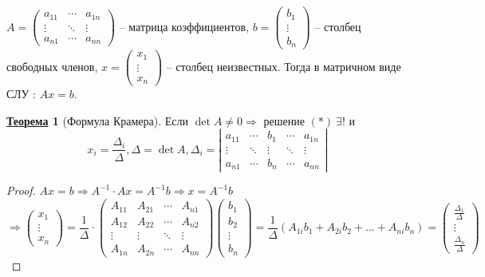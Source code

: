 \documentclass[12pt]{article}
\def\SO{\Rightarrow}     %
\theoremstyle{definition} %
\newtheorem{Thm}{\underline{Теорема}}[subsection] %
\theoremstyle{plain} %
\theoremstyle{remark} %
\begin{document}
{$A = \left(\begin{array}{ccc}
a_{11} & \cdots & a_{1n} \\ 
\vdots & \ddots & \vdots \\ 
a_{n1} & \cdots & a_{nn}
\end{array}\right)$ -- матрица коэффициентов, $b = \begin{pmatrix}
b_1 \\ 
\vdots \\ 
b_n
\end{pmatrix}$ -- столбец свободных членов, $x = \begin{pmatrix}
x_1 \\ 
\vdots \\ 
x_n
\end{pmatrix}$ -- столбец неизвестных.
Тогда в матричном виде СЛУ : $A x = b$.

\begin{Thm}[Формула Крамера]
    Если $\det A \neq 0 \SO$ решение $(*) \ \exists ! $ и
    \[x_i = \frac{\Delta_i}{\Delta}, \Delta = \det A, \Delta_i = \left|\begin{array}{ccccc}
    a_{11} & \cdots & b_1 & \cdots & a_{1n} \\ 
    \vdots & \ddots & \vdots & \ddots & \vdots \\ 
    a_{n1} & \cdots & b_n & \cdots & a_{nn}
    \end{array}\right|\] 
\end{Thm}

\begin{proof}
    $Ax = b \SO A^{-1} \cdot Ax = A^{-1} b \SO x = A^{-1} b$
    \[\SO \begin{pmatrix}
    x_1 \\ 
    \vdots \\ 
    x_n
    \end{pmatrix} = \frac{1}{\Delta} \cdot \left(\begin{array}{cccc}
    A_{11} & A_{21} & \cdots & A_{n1} \\ 
    A_{12} & A_{22} & \cdots & A_{n2} \\ 
    \vdots & \vdots & \ddots & \vdots \\ 
    A_{1n} & A_{2n} & \cdots & A_{nn}
    \end{array}\right) \begin{pmatrix}
    b_1 \\ 
    b_2 \\ 
    \vdots \\ 
    b_n
    \end{pmatrix} = \frac{1}{\Delta} (A_{1i} b_1 + A_{2i} b_2 + ... + A_{ni} b_n) = \begin{pmatrix}
    \frac{\Delta_1}{\Delta} \\ 
    \vdots \\ 
    \frac{\Delta_n}{\Delta}
    \end{pmatrix}\]
\end{proof}

}
\end{document}
